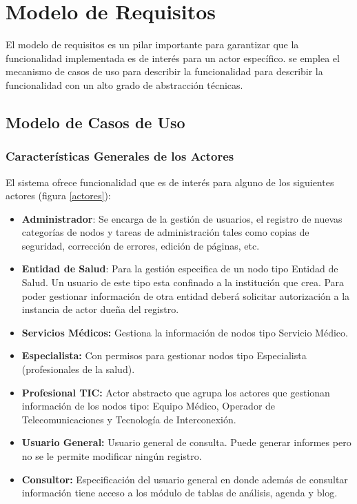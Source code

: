 \chapter{Modelo de Requisitos}
\label{modelo_requisitos}

El modelo de requisitos es un pilar importante para garantizar que la funcionalidad implementada es de interés para un actor específico. se emplea el mecanismo de casos de uso para describir la funcionalidad para describir la funcionalidad con un alto grado de abstracción técnicas. 

\section{Modelo de Casos de Uso}
\subsection{Características Generales de los Actores}

El sistema ofrece funcionalidad que es de interés para alguno de los siguientes actores (figura \ref{actores}):

\begin{itemize}
\item \textbf{Administrador}: Se encarga de la gestión de usuarios, el registro de nuevas categorías de nodos y tareas de administración tales como copias de seguridad, corrección de errores, edición de páginas, etc.
\item \textbf{Entidad de Salud}: Para la gestión especifica de un nodo tipo Entidad de Salud. Un usuario de este tipo esta confinado a la institución que crea. Para poder gestionar información de otra entidad deberá solicitar autorización a la instancia de actor dueña del registro.
\item \textbf{Servicios Médicos:} Gestiona la información de nodos tipo Servicio Médico.
\item \textbf{Especialista:} Con permisos para gestionar nodos tipo Especialista (profesionales de la salud).
\item \textbf{Profesional TIC:} Actor abstracto que agrupa los actores que gestionan información de los nodos tipo: Equipo Médico, Operador de Telecomunicaciones y Tecnología de Interconexión.
\item \textbf{Usuario General:} Usuario general de consulta. Puede generar informes pero no se le permite modificar ningún registro.
\item \textbf{Consultor:} Especificación del usuario general en donde además de consultar información tiene acceso a los módulo de tablas de análisis, agenda y blog.
\end{itemize}

